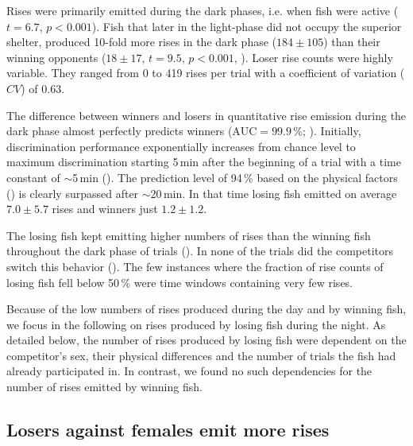 Rises were primarily emitted during the dark phases, i.e. when fish were active ($t=6.7$, $p<0.001$). Fish that later in the light-phase did not occupy the superior shelter, produced 10-fold more rises in the dark phase ($184 \pm 105$) than their winning opponents ($18\pm 17$, $t=9.5$, $p<0.001$, ). Loser rise counts were highly variable. They ranged from 0 to 419 rises per trial with a coefficient of variation ($CV$) of $0.63$.

The difference between winners and losers in quantitative rise emission during the dark phase almost perfectly predicts winners ($\text{AUC} = 99.9$\,\%; ). Initially, discrimination performance exponentially increases from chance level to maximum discrimination starting 5\,min after the beginning of a trial with a time constant of $\sim$5\,min (). The prediction level of 94\,\% based on the physical factors () is clearly surpassed after $\sim$20\,min. In that time losing fish emitted on average $7.0 \pm 5.7$ rises and winners just $1.2 \pm 1.2$.

The losing fish kept emitting higher numbers of rises than the winning fish throughout the dark phase of trials (). In none of the trials did the competitors switch this behavior (). The few instances where the fraction of rise counts of losing fish fell below 50\,\% were time windows containing very few rises.

Because of the low numbers of rises produced during the day and by winning fish, we focus in the following on rises produced by losing fish during the night. As detailed below, the number of rises produced by losing fish were dependent on the competitor's sex, their physical differences and the number of trials the fish had already participated in. In contrast, we found no such dependencies for the number of rises emitted by winning fish.
 
\subsection{Losers against females emit more rises}

